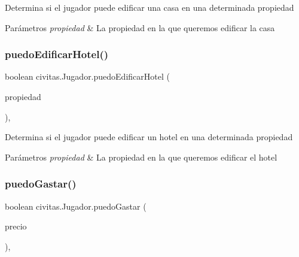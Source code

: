 Determina si el jugador puede edificar una casa en una determinada propiedad 
\begin{DoxyParams}{Parámetros}
{\em propiedad} & La propiedad en la que queremos edificar la casa \\
\hline
\end{DoxyParams}
\mbox{\label{classcivitas_1_1Jugador_ab5a6f51daa7036633cfba1f68b653228}} 
\subsubsection{\texorpdfstring{puedo\+Edificar\+Hotel()}{puedoEdificarHotel()}}
{\footnotesize\ttfamily boolean civitas.\+Jugador.\+puedo\+Edificar\+Hotel (\begin{DoxyParamCaption}\item[{\hyperlink{classcivitas_1_1TituloPropiedad}{Titulo\+Propiedad}}]{propiedad }\end{DoxyParamCaption})\hspace{0.3cm}{\ttfamily [inline]}, {\ttfamily [private]}}

Determina si el jugador puede edificar un hotel en una determinada propiedad 
\begin{DoxyParams}{Parámetros}
{\em propiedad} & La propiedad en la que queremos edificar el hotel \\
\hline
\end{DoxyParams}
\mbox{\label{classcivitas_1_1Jugador_a459494b841c3ac2c9d93b00307292d89}} 
\subsubsection{\texorpdfstring{puedo\+Gastar()}{puedoGastar()}}
{\footnotesize\ttfamily boolean civitas.\+Jugador.\+puedo\+Gastar (\begin{DoxyParamCaption}\item[{float}]{precio }\end{DoxyParamCaption})\hspace{0.3cm}{\ttfamily [inline]}, {\ttfamily [private]}}

